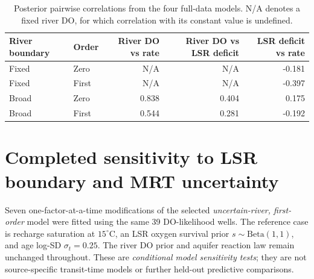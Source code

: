 \documentclass[11pt,a4paper]{article}
\begin{document}
\begin{table}[htbp]
\centering\small
\caption{Posterior pairwise correlations from the four full-data models. N/A denotes a fixed river DO, for which correlation with its constant value is undefined.}
\label{tab:corr}
\begin{tabular}{llrrr}
\toprule
River boundary & Order & River DO vs rate & River DO vs LSR deficit & LSR deficit vs rate\\
\midrule
Fixed & Zero & N/A & N/A & -0.181\\
Fixed & First & N/A & N/A & -0.397\\
Broad & Zero & 0.838 & 0.404 & 0.175\\
Broad & First & 0.544 & 0.281 & -0.192\\
\bottomrule
\end{tabular}
\end{table}


\FloatBarrier
\section{Completed sensitivity to LSR boundary and MRT uncertainty}
\label{sec:sensitivity}
Seven one-factor-at-a-time modifications of the selected \emph{uncertain-river, first-order} model were fitted using the same 39 DO-likelihood wells. The reference case is recharge saturation at $15^\circ$C, an LSR oxygen survival prior $s\sim\mathrm{Beta}(1,1)$, and age log-SD $\sigma_t=0.25$. The river DO prior and aquifer reaction law remain unchanged throughout. These are \emph{conditional model sensitivity tests}; they are not source-specific transit-time models or further held-out predictive comparisons.
\end{document}
